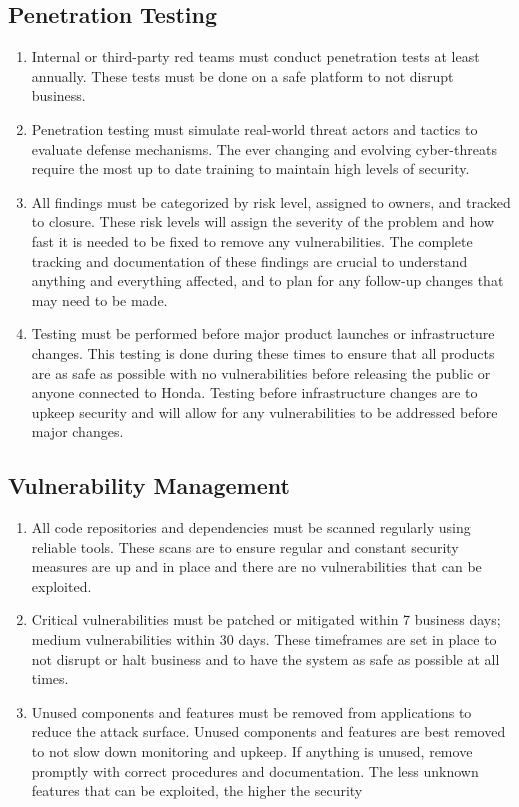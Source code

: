\subsection{Penetration Testing}
\begin{enumerate}
    \item Internal or third-party red teams must conduct penetration tests at least annually. These tests must be done on a safe platform to not disrupt business. 
    \item Penetration testing must simulate real-world threat actors and tactics to evaluate defense mechanisms. The ever changing and evolving cyber-threats require the most up to date training to maintain high levels of security.
    \item All findings must be categorized by risk level, assigned to owners, and tracked to closure. These risk levels will assign the severity of the problem and how fast it is needed to be fixed to remove any vulnerabilities. The complete tracking and documentation of these findings are crucial to understand anything and everything affected, and to plan for any follow-up changes that may need to be made.
    \item Testing must be performed before major product launches or infrastructure changes. This testing is done during these times to ensure that all products are as safe as possible with no vulnerabilities before releasing the public or anyone connected to Honda. Testing before infrastructure changes are to upkeep security and will allow for any vulnerabilities to be addressed before major changes. 
\end{enumerate}
\subsection{Vulnerability Management}
\begin{enumerate}
    \item All code repositories and dependencies must be scanned regularly using reliable tools. These scans are to ensure regular and constant security measures are up and in place and there are no vulnerabilities that can be exploited. 
    \item Critical vulnerabilities must be patched or mitigated within 7 business days; medium vulnerabilities within 30 days. These timeframes are set in place to not disrupt or halt business and to have the system as safe as possible at all times.
    \item Unused components and features must be removed from applications to reduce the attack surface. Unused components and features are best removed to not slow down monitoring and upkeep. If anything is unused, remove promptly with correct procedures and documentation. The less unknown features that can be exploited, the higher the security
\end{enumerate}
